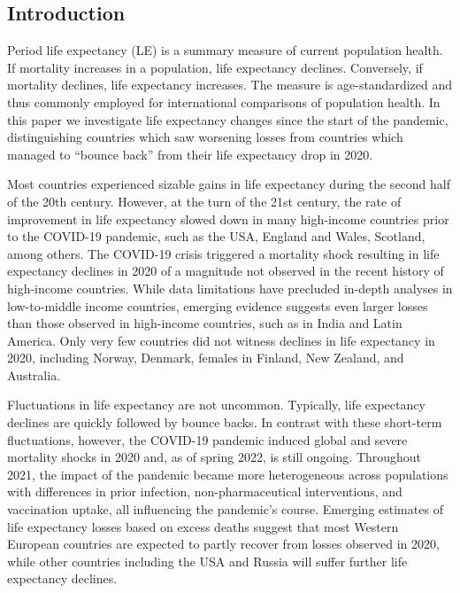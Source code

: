\documentclass[12pt]{article}
\begin{document}
\subsection*{Introduction}

Period life expectancy (LE) is a summary measure of current population health. If mortality increases in a population, life expectancy declines. Conversely, if mortality declines, life expectancy increases. The measure is age-standardized and thus commonly employed for international comparisons of population health.  In this paper we investigate life expectancy changes since the start of the pandemic, distinguishing countries which saw worsening losses from countries which managed to ``bounce back'' from their life expectancy drop in 2020.

Most countries experienced sizable gains in life expectancy during the second half of the 20th century.\cite{Riley2005} However, at the turn of the 21st century, the rate of improvement in life expectancy slowed down in many high-income countries prior to the COVID-19 pandemic,\cite{Raleigh2019} such as the USA,\cite{Ho2018} England and Wales,\cite{Hiam2018} Scotland,\cite{Fenton2019} among others.\cite{Ho2018} The COVID-19 crisis triggered a mortality shock resulting in life expectancy declines in 2020 of a magnitude not observed in the recent history of high-income countries.\cite{Aburto2021b, Islam2021a, Andrasfay2021, Mazzuco2022} While data limitations have precluded in-depth analyses in low-to-middle income countries, emerging evidence suggests even larger losses than those observed in high-income countries, such as in India\cite{Yadav2021} and Latin America.\cite{Castro2021, GarciaGuerrero2021, Lima2021} Only very few countries did not witness declines in life expectancy in 2020, including Norway, Denmark, females in Finland, New Zealand, and Australia.\cite{Aburto2021b, Islam2021a, CanudasRomo2022, Rizzi2021a}

Fluctuations in life expectancy are not uncommon. Typically, life expectancy declines are quickly followed by bounce backs.\cite{Saha2013, Kissler2021} In contrast with these short-term fluctuations, however, the COVID-19 pandemic induced global and severe mortality shocks in 2020 and, as of spring 2022, is still ongoing. Throughout 2021, the impact of the pandemic became more heterogeneous across populations with differences in prior infection, non-pharmaceutical interventions, and vaccination uptake, all influencing the pandemic's course. Emerging estimates of life expectancy losses based on excess deaths suggest that most Western European countries are expected to partly recover from losses observed in 2020, while other countries including the USA and Russia will suffer further life expectancy declines.\cite{Heuveline2022}
\end{document}
